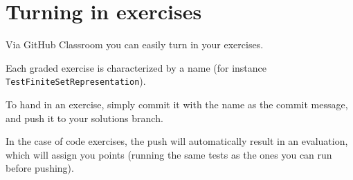 
\section{Turning in exercises}\label{sec:handin_instructions}

Via GitHub Classroom you can easily turn in your exercises.

Each graded exercise is characterized by a name (for instance \texttt{Test\-Finite\-Set\-Representation}).

To hand in an exercise, simply commit it with the name as the commit message, and push it to your solutions branch.

In the case of code exercises, the push will automatically result in an evaluation, which will assign you points (running the same tests as the ones you can run before pushing).
 